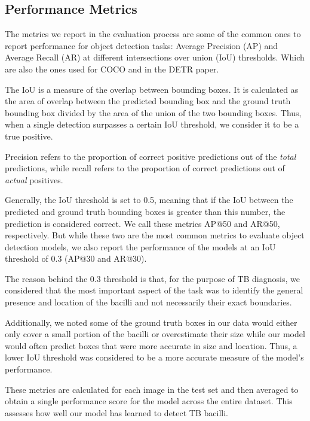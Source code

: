 \documentclass[../main.tex]{subfiles}
\begin{document}
    
    \subsection{Performance Metrics}
        
    The metrics we report in the evaluation process are some of the common ones to report performance for object detection tasks: Average Precision (AP) and Average Recall (AR) at different intersections over union (IoU) thresholds. Which are also the ones used for COCO and in the DETR paper.

    The IoU is a measure of the overlap between bounding boxes. It is calculated as the area of overlap between the predicted bounding box and the ground truth bounding box divided by the area of the union of the two bounding boxes. Thus, when a single detection surpasses a certain IoU threshold, we consider it to be a true positive.

    Precision refers to the proportion of correct positive predictions out of 
    the \textit{total} predictions, while recall refers to the proportion of correct predictions out of \textit{actual} positives. 

    Generally, the IoU threshold is set to 0.5, meaning that if the IoU between the predicted and ground truth bounding boxes is greater than this number, the prediction is considered correct. We call these metrics AP@50 and AR@50, respectively. But while these two are the most common metrics to evaluate object detection models, we also report the performance of the models at an IoU threshold of 0.3 (AP@30 and AR@30). 
    
    The reason behind the 0.3 threshold is that, for the purpose of TB diagnosis, we considered that the most important aspect of the task was to identify the general presence and location of the bacilli and not necessarily their exact boundaries. 
    
    Additionally, we noted some of the ground truth boxes in our data would either only cover a small portion of the bacilli or overestimate their size while our model would often predict boxes that were more accurate in size and location. Thus, a lower IoU threshold was considered to be a more accurate measure of the model's performance.
      
    These metrics are calculated for each image in the test set and then averaged to obtain a single performance score for the model across the entire dataset. This assesses how well our model has learned to detect TB bacilli.
\end{document}
